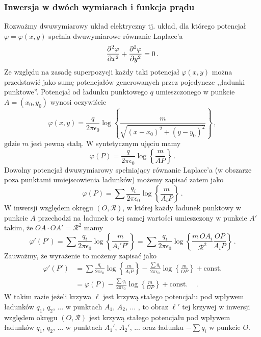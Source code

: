 \documentclass[../main.tex]{subfiles}
\begin{document}
\subsubsection{Inwersja w dwóch wymiarach i funkcja prądu}
Rozważmy dwuwymiarowy układ elektryczny tj. układ, dla którego potencjał \(\varphi=\varphi(x,y)\)
spełnia dwuwymiarowe równanie Laplace'a
\begin{equation*}
    \pdv[2]{\varphi}{x}+\pdv[2]{\varphi}{y}=0\,.
\end{equation*}
Ze względu na zasadę superpozycji każdy taki potencjał \(\varphi(x,y)\) można przedstawić jako sumę
potencjałów generowanych przez pojedyncze ,,ładunki punktowe''. Potencjał od ładunku punktowego
\(q\) umieszczonego w punkcie \(A=(x_0,y_0)\) wynosi oczywiście
\begin{equation*}
    \varphi(x,y)=\frac{q}{2\pi\epsilon_0}\log\left\{\frac{m}{\sqrt{(x-x_0)^2+(y-y_0)^2}}\right\}\,,
\end{equation*}
gdzie \(m\) jest pewną stałą. W syntetycznym ujęciu mamy
\begin{equation*}
    \varphi(P)=\frac{q}{2\pi\epsilon_0}\log\left\{\frac{m}{AP}\right\}\,.
\end{equation*}
Dowolny potencjał dwuwymiarowy spełniający równanie Laplace'a (w obszarze poza punktami
umiejscowienia ładunków) możemy zapisać zatem jako
\begin{equation*}
    \varphi(P)=\sum\frac{q_i}{2\pi\epsilon_0}\log\left\{\frac{m}{A_iP}\right\}\,.
\end{equation*}
W inwersji względem okręgu \((O,\mathscr{R})\), w której każdy ładunek punktowy w punkcie \(A\)
przechodzi na ładunek o tej samej wartości umieszczony w punkcie \(A'\) takim, że \(OA\cdot
OA'=\mathscr{R}^2\) mamy
\begin{equation*}
    \varphi'(P')=\sum\frac{q_i}{2\pi\epsilon_0}\log\left\{\frac{m}{A_i'P'}\right\}=\sum\frac{q_i}{2\pi\epsilon_0}\log\left\{\frac{m\,OA_i}{\mathscr{R}^2}\frac{OP}{A_iP}\right\}\,.
\end{equation*}
Zauważmy, że wyrażenie to możemy zapisać jako
\begin{equation*}
\begin{split}
        \varphi'(P')&=\sum\frac{q_i}{2\pi\epsilon_0}\log\left\{\frac{m}{A_iP}\right\}-\frac{\sum q_i}{2\pi\epsilon_0}\log\left\{\frac{m}{OP}\right\}+\text{const.}\\
        &=\varphi(P)-\frac{\sum q_i}{2\pi\epsilon_0}\log\left\{\frac{m}{OP}\right\}+\text{const.}\quad\,.
\end{split}
\end{equation*}
W takim razie jeżeli krzywa \(\ell\) jest krzywą stałego potencjału pod wpływem ładunków \(q_1\),
\(q_2\), ... w punktach \(A_1\), \(A_2\), ... , to obraz \(\ell'\) tej krzywej w inwersji względem
okręgu \((O,\mathscr{R})\) jest krzywą stałego potencjału pod wpływem ładunków \(q_1\), \(q_2\), ...
w punktach \(A_1'\), \(A_2'\), ... oraz ładunku \(-\sum q_i\) w punkcie \(O\).
\medskip
\end{document}
